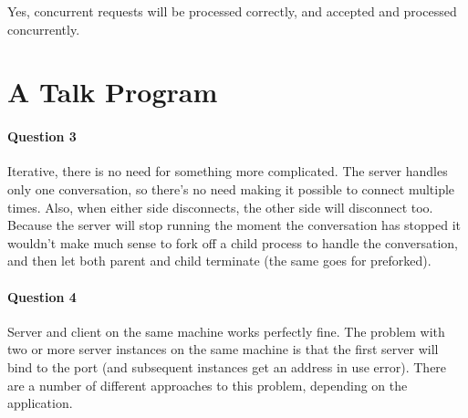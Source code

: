 \documentclass[a4paper,10pt]{article}
\begin{document}
Yes, concurrent requests will be processed correctly, and accepted and processed
concurrently.

\section{A Talk Program}
\paragraph{Question 3}
Iterative, there is no need for something more complicated. The server handles only one conversation, so there's no need making it possible to connect multiple times. Also, when either side disconnects, the other side will disconnect too. Because the server will stop running the moment the conversation has stopped it wouldn't make much sense to fork off a child process to handle the conversation, and then let both parent and child terminate (the same goes for preforked).

\paragraph{Question 4}
Server and client on the same machine works perfectly fine. The problem with two or more server instances on the same machine is that the first server will bind to the port (and subsequent instances get an address in use error). There are a number of different approaches to this problem, depending on the application.
\end{document}
